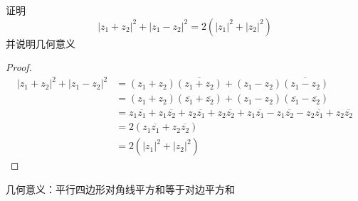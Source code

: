 \begin{homeworkProblem}
证明\[|z_1+ z_2|^2 + |z_1 - z_2|^2 = 2(|z_1|^2 + |z_2|^2)\] 并说明几何意义\newline
\begin{proof}
\[\begin{split}
|z_1+ z_2|^2 + |z_1 - z_2|^2
&= (z_1+z_2)\overline{(z_1+z_2)} + (z_1-z_2)\overline{(z_1-z_2)}\\
&=(z_1+z_2)(\overline{z_1}+\overline{z_2}) + (z_1-z_2)(\overline{z_1}-\overline{z_2})\\
&=z_1\overline{z_1} + z_1\overline{z_2} + z_2\overline{z_1} + z_2\overline{z_2} + z_1\overline{z_1}-z_1\overline{z_2}-z_2\overline{z_1} + z_2\overline{z_2} \\
&= 2(z_1\overline{z_1} + z_2\overline{z_2})\\
&= 2(|z_1|^2 + |z_2|^2)
\end{split}\]
\end{proof}
几何意义：平行四边形对角线平方和等于对边平方和
\end{homeworkProblem}

